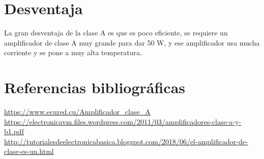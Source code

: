\documentclass[12pt,a4paper]{article}
\begin{document}
\section{Desventaja}
La gran desventaja de la clase A es que es poco eficiente, se requiere un amplificador de clase A muy grande para dar 50 W, y ese amplificador usa mucha corriente y se pone a muy alta temperatura.

\section*{Referencias bibliográficas}
\url{https://www.ecured.cu/Amplificador_clase_A}\\
\url{https://electronicavm.files.wordpress.com/2011/03/amplificadores-clase-a-y-b1.pdf}\\
\url{http://tutorialesdeelectronicabasica.blogspot.com/2018/06/el-amplificador-de-clase-es-un.html}
\end{document}
